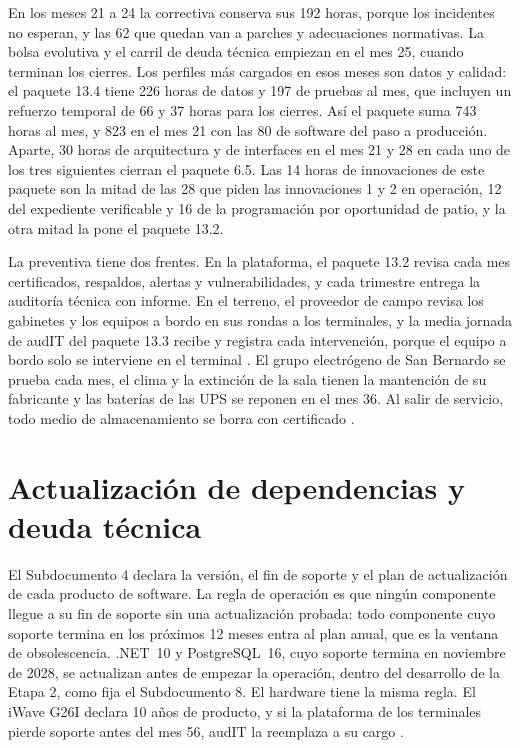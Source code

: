 En los meses 21 a 24 la correctiva conserva sus 192 horas, porque los incidentes no esperan, y las 62
que quedan van a parches y adecuaciones normativas. La bolsa evolutiva y el carril de deuda técnica
empiezan en el mes 25, cuando terminan los cierres. Los perfiles más cargados en esos meses son datos y
calidad: el paquete 13.4 tiene 226 horas de datos y 197 de pruebas al mes, que incluyen un refuerzo
temporal de 66 y 37 horas para los cierres. Así el paquete suma 743 horas al mes, y 823 en el mes 21
con las 80 de software del paso a producción. Aparte, 30 horas de arquitectura y de interfaces en el
mes 21 y 28 en cada uno de los tres siguientes cierran el paquete 6.5. Las 14 horas de innovaciones de este paquete son la mitad de
las 28 que piden las innovaciones 1 y 2 en operación, 12 del expediente verificable y 16 de la
programación por oportunidad de patio, y la otra mitad la pone el paquete 13.2.

La preventiva tiene dos frentes. En la plataforma, el paquete 13.2 revisa cada mes certificados,
respaldos, alertas y vulnerabilidades, y cada trimestre entrega la auditoría técnica con informe. En el
terreno, el proveedor de campo revisa los gabinetes y los equipos a bordo en sus rondas a los terminales,
y la media jornada de audIT del paquete 13.3 recibe y registra cada intervención, porque el equipo a
bordo solo se interviene en el terminal . El grupo electrógeno de San Bernardo se
prueba cada mes, el clima y la extinción de la sala tienen la mantención de su fabricante y las baterías
de las UPS se reponen en el mes 36. Al salir de servicio, todo medio de almacenamiento se borra con
certificado .

\section{Actualización de dependencias y deuda técnica}\label{sec:11-actualizacion-de-dependencias-y-}

El Subdocumento 4 declara la versión, el fin de soporte y el plan de actualización de cada producto de
software. La regla de operación es que ningún componente llegue a su fin de soporte sin una actualización
probada: todo componente cuyo soporte termina en los próximos 12 meses entra al plan anual, que es la
ventana de obsolescencia. .NET~10 y PostgreSQL~16, cuyo soporte termina en noviembre de 2028, se
actualizan antes de empezar la operación, dentro del desarrollo de la Etapa 2, como fija el Subdocumento
8. El hardware tiene la misma regla. El iWave G26I declara 10 años de producto, y si la plataforma de
los terminales pierde soporte antes del mes 56, audIT la reemplaza a su cargo .

